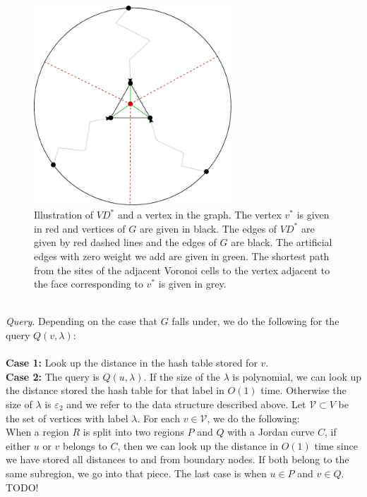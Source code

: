 \begin{figure}[h!]
  \centering
  \includegraphics[width=0.66\textwidth]{figs/vd2.pdf}
  \caption{Illustration of $VD^*$ and a vertex in the graph. The vertex $v^*$ is given in
  red and vertices of $G$ are given in black. The edges of $VD^*$ are given by red dashed
  lines and the edges
of $G$ are black. The artificial edges with zero weight we add are given in green. The
shortest path from the sites of the adjacent Voronoi cells to the vertex adjacent to the
face corresponding to $v^*$ is given in grey.}
    \label{vd2}
\end{figure}
\noindent \\
\indent \textit{Query}. Depending on the case that $G$ falls under, we do the following for the
query $Q(v, \lambda)$: \\
\\
\textbf{Case 1:} Look up the distance in the hash table stored for $v$. \\
\textbf{Case 2:} The query is $Q(u,\lambda)$. If the size of the $\lambda$ is polynomial,
we can look up the distance stored the hash table for that label in $O(1)$ time.
Otherwise the size of $\lambda$ is $\varepsilon_2$ and we refer to the data structure
described above. Let $\mathcal{V}\subset V$ be the set of vertices with label $\lambda$.
For each $v\in \mathcal{V}$, we do the following:\\
When a region $R$ is split into two regions $P$ and $Q$ with a Jordan curve $C$, if
either $u$ or $v$ belongs to $C$, then we can look up the distance in $O(1)$ time since
we have stored all distances to and from boundary nodes. If both belong to the same
subregion, we go into that piece. The last case is when $u\in P$ and $v\in Q$. TODO!

